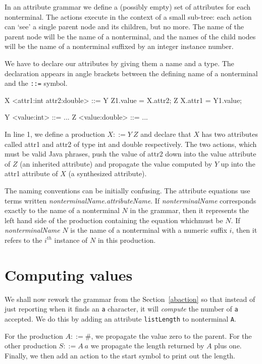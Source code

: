 In an attribute grammar we define a (possibly empty) set of attributes for each nonterminal. The
actions execute in the context of a small sub-tree: each action
can `see' a single parent node and its children, but no more. The name
of the parent node will be the name of a nonterminal, and the names of
the child nodes will be the name of a nonterminal suffixed by an
integer instance number.

We have to declare our attributes by giving them a name and a type. The declaration appears in angle brackets between the defining name of a nonterminal and the {\tt ::=} symbol.
\begin{codeblock}
X <attr1:int attr2:double> ::= Y { Z1.value = X.attr2; } Z { X.attr1 = Y1.value; }

Y <value:int> ::= ...
Z <value:double> ::= ...
\end{codeblock}
In line 1, we define a production $ X ::= Y\  Z$ and declare that $X$ has two attributes called {\sf attr1} and {\sf attr2} of type {\sf int} and {\sf double} respectively. The two actions, which must be valid Java phrases, push the value of {\sf attr2} down into the {\sf value} attribute of $Z$ (an inherited attribute) and propagate the {\sf value} computed by $Y$ up into the {\sf attr1} attribute of $X$ (a synthesized attribute).

The naming conventions can be initially confusing. The attribute equations use terms written {\em nonterminalName.attributeName}. If {\em nonterminalName} corresponds exactly to the name of a nonterminal $N$ in the grammar, then it represents the left hand side of the production containing the equation whichmust be $N$. If {\em nonterminalName} $N$ is the name of a nonterminal with a numeric suffix $i$, then it refers to the $i^{th}$ instance of $N$ in this production.
\section{Computing values}
We shall now rework the grammar from the Section~\ref{abaction} so that instead of just reporting when it finds an {\tt a} character, it will {\em compute} the number of {\tt a} accepted. We do this by adding an attribute {\tt listLength} to nonterminal {\tt A}. 

For the production $A ::= \#$, we propagate the value zero to the parent. For the
 other production $S ::= A\ a$ we propagate the length returned by $A$ plus one. Finally, we then add
an action to the start symbol to print out the length. 

